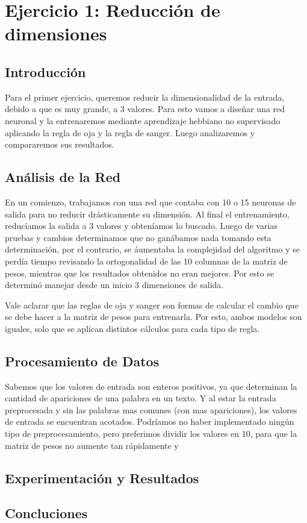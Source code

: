 \section{Ejercicio 1: Reducción de dimensiones}

\subsection{Introducción}

\par Para el primer ejercicio, queremos reducir la dimensionalidad de la entrada, debido a que es muy grande, a 3 valores. Para esto vamos a diseñar una red neuronal y la entrenaremos mediante aprendizaje hebbiano no supervisado aplicando la regla de oja y la regla de sanger. Luego analizaremos y compararemos sus resultados.

\subsection{Análisis de la Red}

\par En un comienzo, trabajamos con una red que contaba con 10 o 15 neuronas de salida para no reducir drásticamente su dimensión. Al final el entrenamiento, reducíamos la salida a 3 valores y obteníamos lo buscado. Luego de varias pruebas y cambios determinamos que no ganábamos nada tomando esta determinación, por el contrario, se áumentaba la complejidad del algoritmo y se perdía tiempo revisando la ortogonalidad de las 10 columnas de la matriz de pesos, mientras que los resultados obtenidos no eran mejores. Por esto se determinó manejar desde un inicio 3 dimensiones de salida.

\par Vale aclarar que las reglas de oja y sanger son formas de calcular el cambio que se debe hacer a la matriz de pesos para entrenarla. Por esto, ambos modelos son iguales, solo que se aplican distintos cálculos para cada tipo de regla.

\subsection{Procesamiento de Datos}

\par Sabemos que los valores de entrada son enteros positivos, ya que determinan la cantidad de apariciones de una palabra en un texto. Y al estar la entrada preprocesada y sin las palabras mas comunes (con mas apariciones), los valores de entrada se encuentran acotados. Podríamos no haber implementado ningún tipo de preprocesamiento, pero preferimos dividir los valores en 10, para que la matriz de pesos no aumente tan rápidamente y 


\subsection{Experimentación y Resultados}

\subsection{Concluciones}